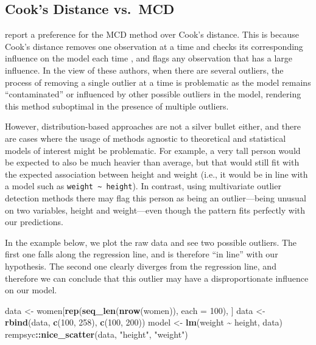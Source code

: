 \documentclass[sn-basic, lineno,pdflatex]{sn-jnl}
\newenvironment{Shaded}{\begin{snugshade}}{\end{snugshade}}
\newcommand{\AttributeTok}[1]{\textcolor[rgb]{0.13,0.29,0.53}{#1}}
\newcommand{\DecValTok}[1]{\textcolor[rgb]{0.00,0.00,0.81}{#1}}
\newcommand{\FunctionTok}[1]{\textcolor[rgb]{0.13,0.29,0.53}{\textbf{#1}}}
\newcommand{\NormalTok}[1]{#1}
\newcommand{\OtherTok}[1]{\textcolor[rgb]{0.56,0.35,0.01}{#1}}
\newcommand{\SpecialCharTok}[1]{\textcolor[rgb]{0.81,0.36,0.00}{\textbf{#1}}}
\newcommand{\StringTok}[1]{\textcolor[rgb]{0.31,0.60,0.02}{#1}}
\begin{document}
\hypertarget{cooks-distance-vs.-mcd}{%
\subsection{Cook's Distance vs.~MCD}\label{cooks-distance-vs.-mcd}}

\citet{leys2018outliers} report a preference for the MCD method over
Cook's distance. This is because Cook's distance removes one observation
at a time and checks its corresponding influence on the model each time
\citep{cook1977detection}, and flags any observation that has a large
influence. In the view of these authors, when there are several
outliers, the process of removing a single outlier at a time is
problematic as the model remains ``contaminated'' or influenced by other
possible outliers in the model, rendering this method suboptimal in the
presence of multiple outliers.

However, distribution-based approaches are not a silver bullet either,
and there are cases where the usage of methods agnostic to theoretical
and statistical models of interest might be problematic. For example, a
very tall person would be expected to also be much heavier than average,
but that would still fit with the expected association between height
and weight (i.e., it would be in line with a model such as
\texttt{weight\ \textasciitilde{}\ height}). In contrast, using
multivariate outlier detection methods there may flag this person as
being an outlier---being unusual on two variables, height and
weight---even though the pattern fits perfectly with our predictions.

In the example below, we plot the raw data and see two possible
outliers. The first one falls along the regression line, and is
therefore ``in line'' with our hypothesis. The second one clearly
diverges from the regression line, and therefore we can conclude that
this outlier may have a disproportionate influence on our model.

\begin{Shaded}
\begin{Highlighting}[]
\NormalTok{data }\OtherTok{\textless{}{-}}\NormalTok{ women[}\FunctionTok{rep}\NormalTok{(}\FunctionTok{seq\_len}\NormalTok{(}\FunctionTok{nrow}\NormalTok{(women)), }\AttributeTok{each =} \DecValTok{100}\NormalTok{), ]}
\NormalTok{data }\OtherTok{\textless{}{-}} \FunctionTok{rbind}\NormalTok{(data, }\FunctionTok{c}\NormalTok{(}\DecValTok{100}\NormalTok{, }\DecValTok{258}\NormalTok{), }\FunctionTok{c}\NormalTok{(}\DecValTok{100}\NormalTok{, }\DecValTok{200}\NormalTok{))}
\NormalTok{model }\OtherTok{\textless{}{-}} \FunctionTok{lm}\NormalTok{(weight }\SpecialCharTok{\textasciitilde{}}\NormalTok{ height, data)}
\NormalTok{rempsyc}\SpecialCharTok{::}\FunctionTok{nice\_scatter}\NormalTok{(data, }\StringTok{"height"}\NormalTok{, }\StringTok{"weight"}\NormalTok{)}
\end{Highlighting}
\end{Shaded}
\end{document}
